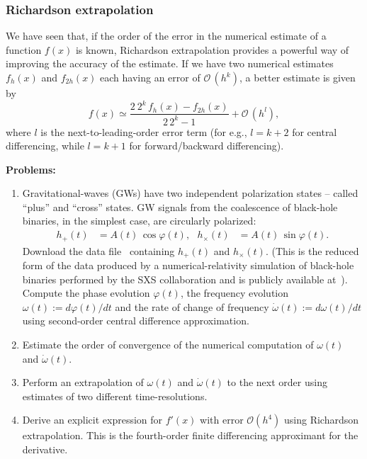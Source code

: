 \subsubsection{Richardson extrapolation}

We have seen that, if the order of the error in the numerical estimate of a function $f(x)$ is known, Richardson extrapolation provides a powerful way of improving the accuracy of the estimate. If we have two numerical estimates $f_{h}(x)$ and $f_{2h}(x)$ each having an error of $\mathcal{O}\,(h^k)$, a better estimate is given by 
\begin{equation}
f(x) \simeq \frac{2 ~ 2^k\, f_{h}(x) - f_{2h}(x)}{2\,2^k -1 } + \mathcal{O}\,(h^{l}),
\end{equation}
where $l$ is the next-to-leading-order error term (for e.g., $l = k+2$ for central differencing, while $l = k+1$ for forward/backward differencing). 


\textbf{Problems:}
\label{sec:BBH_nr_data_fd}
\begin{enumerate}
\item Gravitational-waves (GWs) have two independent polarization states -- called ``plus'' and ``cross'' states. GW signals from the coalescence of black-hole binaries, in the simplest case, are circularly polarized: 
\begin{eqnarray}
h_+(t) & = A(t) \, \cos \varphi(t), ~~~ h_\times(t) & = A(t) \, \sin \varphi(t). 
\end{eqnarray}
Download the data file~\cite{nrdata} containing $h_+(t)$ and $h_\times(t)$. (This is the reduced form of the data produced by a numerical-relativity simulation of black-hole binaries performed by the SXS collaboration and is publicly available at~\cite{SXScatalog}). Compute the phase evolution $\varphi(t)$, the frequency evolution $\omega(t) := d\varphi(t)/dt$ and the rate of change of frequency $\dot{\omega}(t) := d\omega(t)/dt$ using second-order central difference approximation. 
\item Estimate the order of convergence of the numerical computation of $\omega(t)$ and $\dot{\omega}(t)$. 
\item Perform an extrapolation of $\omega(t)$ and $\dot{\omega}(t)$ to the next order using estimates of two different time-resolutions.  
\item Derive an explicit expression for $f'(x)$ with error $\mathcal{O}(h^4)$ using Richardson extrapolation. This is the fourth-order finite differencing approximant for the derivative. 
\end{enumerate}
